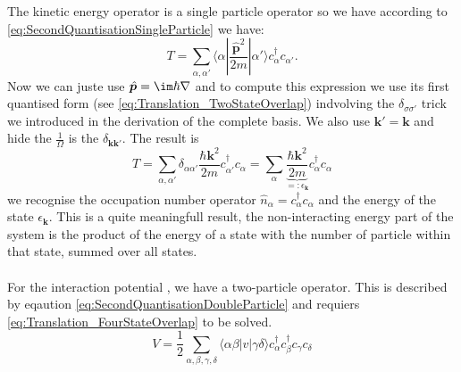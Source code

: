 \documentclass[../main.tex]{subfile}
\begin{document}
The kinetic energy operator is a single particle operator so we have according to \ref{eq:SecondQuantisationSingleParticle} we have:
\[
    T = \sum_{\alpha,\alpha'} \langle \alpha|\frac{\hat{\bm{p}}^2}{2m}|\alpha'\rangle c_{\alpha}^{\dagger}c_{\alpha'}.
\]
Now we can juste use $\hat{\bm{p}} = \im \hbar \nabla$ and to compute this expression we use its 
first quantised form (see \ref{eq:Translation_TwoStateOverlap}) indvolving the $\delta_{\sigma\sigma'}$ trick we introduced
in the derivation of the complete basis. We also use  $\bm{k}' = \bm{k}$ and hide the $\frac{1}{\Omega}$ is the $\delta_{\bm{k}\bm{k}'}$. The result is
\[
T = \sum_{\alpha,\alpha'} \delta_{\alpha\alpha'} \frac{\hbar \bm{k}^2}{2m} c_{\alpha'}^{\dagger} c_{\alpha} = \sum_{\alpha} \underbrace{\frac{\hbar \bm{k}^2}{2m}}_{=:\epsilon_{\bm{k}}} c_{\alpha}^{\dagger} c_{\alpha}
\]
we recognise the occupation number operator $\hat{n}_{\alpha} = c_{\alpha}^{\dagger} c_{\alpha}$ and the energy of the state $\epsilon_{\bm{k}}$. This is a quite
meaningfull result, the non-interacting energy part of the system is the product of the energy of a state with the number of particle within that state, summed over all states.\\ 

\\

For the interaction potential , we have a two-particle operator. This is described by eqaution \ref{eq:SecondQuantisationDoubleParticle} and
requiers \ref{eq:Translation_FourStateOverlap} to be solved.
\[
    V = \frac{1}{2} \sum_{\alpha, \beta, \gamma,\delta} \langle \alpha \beta |v|\gamma\delta\rangle c_{\alpha}^{\dagger}c_{\beta}^{\dagger}c_{\gamma}c_{\delta}
\]
\end{document}
